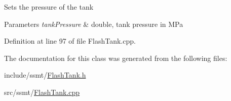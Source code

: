 Sets the pressure of the tank 
\begin{DoxyParams}{Parameters}
{\em tank\+Pressure} & double, tank pressure in M\+Pa \\
\hline
\end{DoxyParams}


Definition at line 97 of file Flash\+Tank.\+cpp.



The documentation for this class was generated from the following files\+:\begin{DoxyCompactItemize}
\item 
include/ssmt/\hyperlink{_flash_tank_8h}{Flash\+Tank.\+h}\item 
src/ssmt/\hyperlink{_flash_tank_8cpp}{Flash\+Tank.\+cpp}\end{DoxyCompactItemize}
